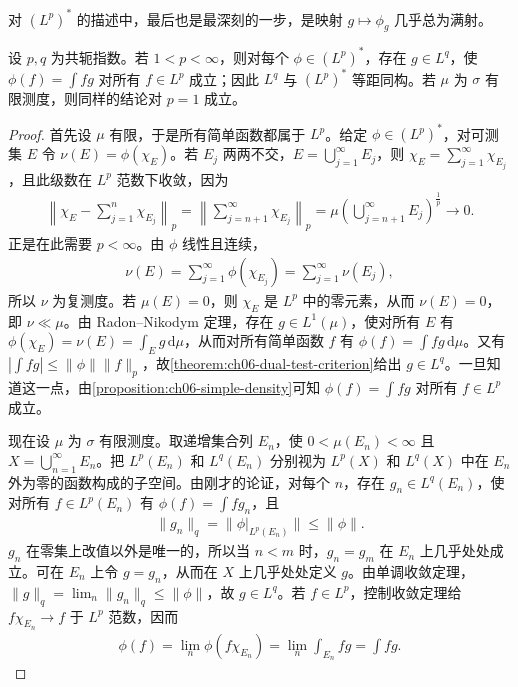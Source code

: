 \documentclass[../../main.tex]{subfiles}
\begin{document}
对 $(L^p)^*$ 的描述中，最后也是最深刻的一步，是映射 $g\mapsto\phi_g$ 几乎总为满射。
\begin{theorem}\label{theorem:ch06-lp-duality}
设 $p,q$ 为共轭指数。若 $1<p<\infty$，则对每个 $\phi\in(L^p)^*$，存在 $g\in L^q$，使 $\phi(f)=\int fg$ 对所有 $f\in L^p$ 成立；因此 $L^q$ 与 $(L^p)^*$ 等距同构。若 $\mu$ 为 $\sigma$ 有限测度，则同样的结论对 $p=1$ 成立。
\end{theorem}
\begin{proof}
首先设 $\mu$ 有限，于是所有简单函数都属于 $L^p$。给定 $\phi\in(L^p)^*$，对可测集 $E$ 令 $\nu(E)=\phi(\chi_E)$。若 $E_j$ 两两不交，$E=\bigcup_{j=1}^\infty E_j$，则 $\chi_E=\sum_{j=1}^\infty\chi_{E_j}$，且此级数在 $L^p$ 范数下收敛，因为
\begin{align*}
\left\|\chi_E-\sum_{j=1}^n\chi_{E_j}\right\|_p
=\left\|\sum_{j=n+1}^\infty\chi_{E_j}\right\|_p
=\mu\left(\bigcup_{j=n+1}^\infty E_j\right)^{\frac1p}\longrightarrow0.
\end{align*}
正是在此需要 $p<\infty$。由 $\phi$ 线性且连续，
\begin{align*}
\nu(E)=\sum_{j=1}^\infty\phi(\chi_{E_j})=\sum_{j=1}^\infty\nu(E_j),
\end{align*}
所以 $\nu$ 为复测度。若 $\mu(E)=0$，则 $\chi_E$ 是 $L^p$ 中的零元素，从而 $\nu(E)=0$，即 $\nu\ll\mu$。由 Radon–Nikodym 定理，存在 $g\in L^1(\mu)$，使对所有 $E$ 有 $\phi(\chi_E)=\nu(E)=\int_Eg\,\mathrm d\mu$，从而对所有简单函数 $f$ 有 $\phi(f)=\int fg\,\mathrm d\mu$。又有 $|\int fg|\leqslant\|\phi\|\|f\|_p$，故\cref{theorem:ch06-dual-test-criterion}给出 $g\in L^q$。一旦知道这一点，由\cref{proposition:ch06-simple-density}可知 $\phi(f)=\int fg$ 对所有 $f\in L^p$ 成立。

现在设 $\mu$ 为 $\sigma$ 有限测度。取递增集合列 $E_n$，使 $0<\mu(E_n)<\infty$ 且 $X=\bigcup_{n=1}^\infty E_n$。把 $L^p(E_n)$ 和 $L^q(E_n)$ 分别视为 $L^p(X)$ 和 $L^q(X)$ 中在 $E_n$ 外为零的函数构成的子空间。由刚才的论证，对每个 $n$，存在 $g_n\in L^q(E_n)$，使对所有 $f\in L^p(E_n)$ 有 $\phi(f)=\int fg_n$，且
\begin{align*}
\|g_n\|_q=\|\phi|_{L^p(E_n)}\|\leqslant\|\phi\|.
\end{align*}
$g_n$ 在零集上改值以外是唯一的，所以当 $n<m$ 时，$g_n=g_m$ 在 $E_n$ 上几乎处处成立。可在 $E_n$ 上令 $g=g_n$，从而在 $X$ 上几乎处处定义 $g$。由单调收敛定理，$\|g\|_q=\lim_n\|g_n\|_q\leqslant\|\phi\|$，故 $g\in L^q$。若 $f\in L^p$，控制收敛定理给 $f\chi_{E_n}\to f$ 于 $L^p$ 范数，因而
\begin{align*}
\phi(f)=\lim_n\phi(f\chi_{E_n})=\lim_n\int_{E_n}fg=\int fg.
\end{align*}


\end{proof}
\end{document}
